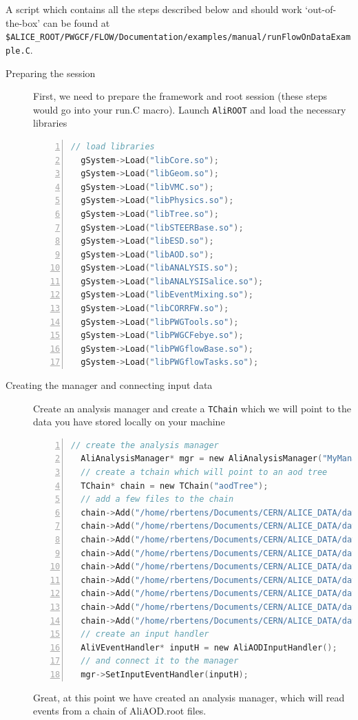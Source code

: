 \documentclass[a4paper]{book}
\numberwithin{equation}{subsection}
\begin{document}
A script which contains all the steps described below and should work `out-of-the-box' can be found at \texttt{\$ALICE\_ROOT/PWGCF/FLOW/Documentation/examples/manual/runFlowOnDataExample.C}.
\begin{description}
\item [Preparing the session] First, we need to prepare the framework and root session (these steps would go into your run.C macro). Launch \texttt{AliROOT} and load the necessary libraries
\begin{lstlisting}[language=C, numbers=left]
  // load libraries
  gSystem->Load("libCore.so");        
  gSystem->Load("libGeom.so");
  gSystem->Load("libVMC.so");
  gSystem->Load("libPhysics.so");
  gSystem->Load("libTree.so");
  gSystem->Load("libSTEERBase.so");
  gSystem->Load("libESD.so");
  gSystem->Load("libAOD.so");
  gSystem->Load("libANALYSIS.so");
  gSystem->Load("libANALYSISalice.so");
  gSystem->Load("libEventMixing.so");
  gSystem->Load("libCORRFW.so");
  gSystem->Load("libPWGTools.so");
  gSystem->Load("libPWGCFebye.so");
  gSystem->Load("libPWGflowBase.so");
  gSystem->Load("libPWGflowTasks.so"); \end{lstlisting}
  \item [Creating the manager and connecting input data]
      Create an analysis manager and create a \texttt{TChain} which we will point to the data you have stored locally on your machine
\begin{lstlisting}[language=C, numbers=left]
  // create the analysis manager
  AliAnalysisManager* mgr = new AliAnalysisManager("MyManager");
  // create a tchain which will point to an aod tree
  TChain* chain = new TChain("aodTree");
  // add a few files to the chain
  chain->Add("/home/rbertens/Documents/CERN/ALICE_DATA/data/2010/LHC10h/000139510/ESDs/pass2/AOD086/0003/AliAOD.root");
  chain->Add("/home/rbertens/Documents/CERN/ALICE_DATA/data/2010/LHC10h/000139510/ESDs/pass2/AOD086/0003/AliAOD.root");
  chain->Add("/home/rbertens/Documents/CERN/ALICE_DATA/data/2010/LHC10h/000139510/ESDs/pass2/AOD086/0004/AliAOD.root");
  chain->Add("/home/rbertens/Documents/CERN/ALICE_DATA/data/2010/LHC10h/000139510/ESDs/pass2/AOD086/0005/AliAOD.root");
  chain->Add("/home/rbertens/Documents/CERN/ALICE_DATA/data/2010/LHC10h/000139510/ESDs/pass2/AOD086/0006/AliAOD.root");
  chain->Add("/home/rbertens/Documents/CERN/ALICE_DATA/data/2010/LHC10h/000139510/ESDs/pass2/AOD086/0007/AliAOD.root");
  chain->Add("/home/rbertens/Documents/CERN/ALICE_DATA/data/2010/LHC10h/000139510/ESDs/pass2/AOD086/0008/AliAOD.root");
  chain->Add("/home/rbertens/Documents/CERN/ALICE_DATA/data/2010/LHC10h/000139510/ESDs/pass2/AOD086/0009/AliAOD.root");
  chain->Add("/home/rbertens/Documents/CERN/ALICE_DATA/data/2010/LHC10h/000139510/ESDs/pass2/AOD086/0010/AliAOD.root");
  // create an input handler
  AliVEventHandler* inputH = new AliAODInputHandler();
  // and connect it to the manager
  mgr->SetInputEventHandler(inputH);\end{lstlisting}
  Great, at this point we have created an analysis manager, which will read events from a chain of AliAOD.root files. 
  

\end{description}
\end{document}
